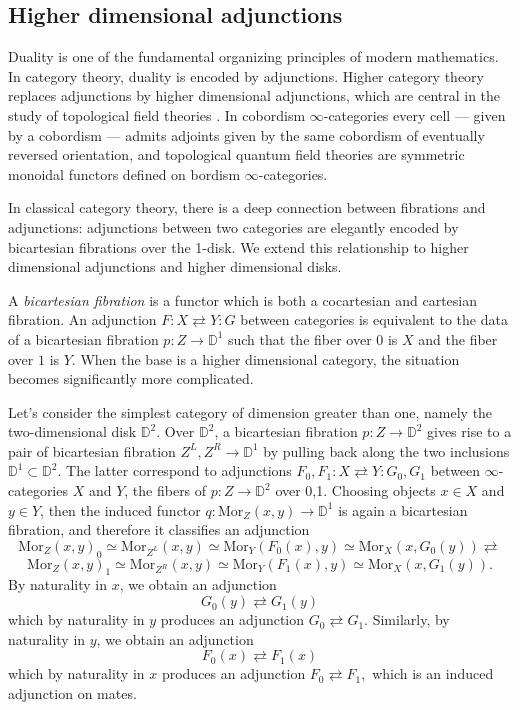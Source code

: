 \documentclass[10pt,oneside]{article}
\numberwithin{equation}{section} %
\numberwithin{figure}{section} %
\theoremstyle{plain}
\theoremstyle{definition}
\newcommand{\bD}{{\mathbb D}}
\newcommand{\Mor}{{\mathrm{Mor}}}
\begin{document}
\subsection{Higher dimensional adjunctions}

Duality is one of the fundamental organizing principles of modern mathematics. In category theory, duality is encoded by adjunctions.
Higher category theory replaces adjunctions by higher dimensional adjunctions, which are central in the study of topological field theories \cite{Cob}.
In cobordism $\infty$-categories every cell --- given by a cobordism --- admits adjoints given by the same cobordism of eventually reversed orientation,
and topological quantum field theories are symmetric monoidal functors defined on bordism $\infty$-categories.

In classical category theory, there is a deep connection between fibrations and adjunctions: adjunctions between two categories are elegantly encoded by bicartesian fibrations over the 1-disk.
We extend this relationship to higher dimensional adjunctions and higher dimensional disks.


A {\em bicartesian fibration} is a functor which is both a cocartesian and cartesian fibration.
An adjunction $F:X\rightleftarrows Y:G$ between categories is equivalent to the data of a bicartesian fibration $p:Z\to\bD^1$ such that the fiber over $0$ is $X$ and the fiber over $1$ is $Y$.
When the base is a higher dimensional category, the situation becomes significantly more complicated.

Let's consider the simplest category of dimension greater than one, namely the two-dimensional disk $\bD^2$.
Over $\bD^2$, a bicartesian fibration $p:Z\to\bD^2$ gives rise to a pair of bicartesian fibration $ Z^L, Z^R \to \bD^1$ by pulling back along the two inclusions $\bD^1 \subset \bD^2.$ The latter correspond to adjunctions $F_0,F_1:X\rightleftarrows Y:G_0,G_1$ between $\infty$-categories $X$ and $Y$, the fibers of $p:Z\to\bD^2$ over 0,1.
Choosing objects $x\in X$ and $y\in Y$, then the induced functor $q:\Mor_Z(x,y)\to\bD^1$ is again a bicartesian fibration, and therefore it classifies an adjunction 
$$\Mor_Z(x,y)_0 \simeq \Mor_{Z^L}(x,y) \simeq \Mor_{Y}(F_0(x),y) \simeq \Mor_{X}(x,G_0(y)) \rightleftarrows $$$$ \Mor_Z(x,y)_1 \simeq \Mor_{Z^R}(x,y) \simeq \Mor_{Y}(F_1(x),y) \simeq \Mor_{X}(x,G_1(y)).$$
By naturality in $x$, we obtain an adjunction
\[
G_0(y) \rightleftarrows G_1(y)
\]
which by naturality in $y$ produces an adjunction
$
G_0 \rightleftarrows G_1.
$
Similarly, by naturality in $y$, we obtain an adjunction
\[
F_0(x) \rightleftarrows F_1(x)
\]
which by naturality in $x$ produces an adjunction
$
F_0 \rightleftarrows F_1,
$
which is an induced adjunction on mates.
\end{document}
